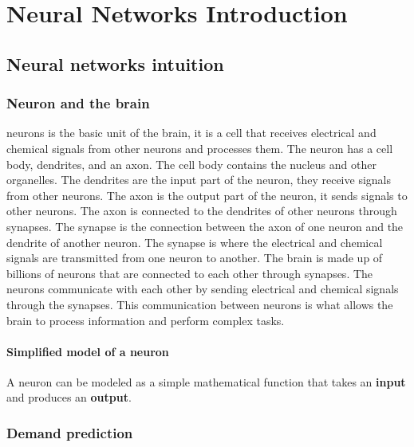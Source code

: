 \chapter{Neural Networks Introduction}
\section{Neural networks intuition}
\subsection{Neuron and the brain}
neurons is the basic unit of the brain, 
it is a cell that receives electrical and chemical signals from other neurons and processes them.
 The neuron has a cell body, dendrites, and an axon. The cell body contains the nucleus and other organelles.
  The dendrites are the input part of the neuron, they receive signals from other neurons.
 The axon is the output part of the neuron, it sends signals to other neurons.
  The axon is connected to the dendrites of other neurons through synapses. 
  The synapse is the connection between the axon of one neuron and the dendrite of another neuron. 
  The synapse is where the electrical and chemical signals are transmitted from one neuron to another. 
  The brain is made up of billions of neurons that are connected to each other through synapses. 
  The neurons communicate with each other by sending electrical and chemical signals through the synapses. 
  This communication between neurons is what allows the brain to process information and perform complex tasks.

\subsubsection*{Simplified model of a neuron}
A neuron can be modeled as a simple mathematical function that takes an \textbf{input} and produces an \textbf{output}.

\subsection{Demand prediction}

